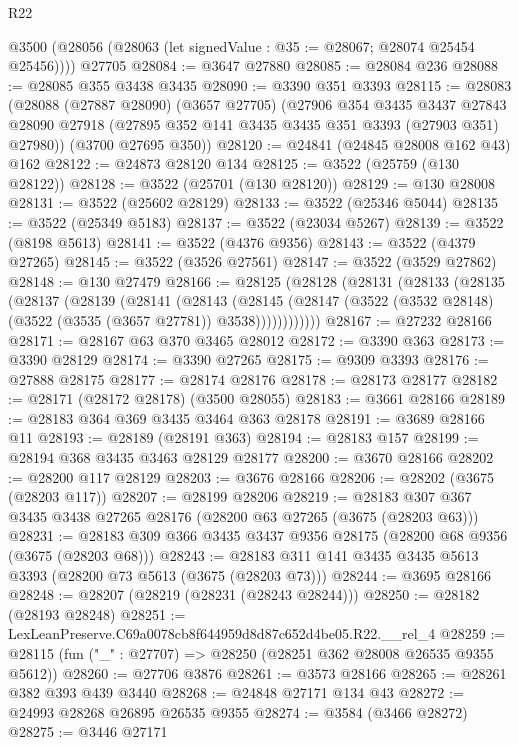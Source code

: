 \begin{lexlean}{R22}
\begin{coremodule}
    @3500 (@28056 (@28063 (let signedValue : @35 := @28067; @28074 @25454 @25456))))
    @27705
@28084 := @3647 @27880
@28085 := @28084 @236
@28088 := @28085 @355 @3438 @3435
@28090 := @3390 @351 @3393
@28115 := @28083
    (@28088
      (@27887 @28090)
      (@3657 @27705)
      (@27906
        @354
        @3435
        @3437
        @27843
        @28090
        @27918
        (@27895 @352 @141 @3435 @3435 @351 @3393 (@27903 @351) @27980))
      (@3700 @27695 @350))
@28120 := @24841 (@24845 @28008 @162 @43) @162
@28122 := @24873 @28120 @134
@28125 := @3522 (@25759 (@130 @28122))
@28128 := @3522 (@25701 (@130 @28120))
@28129 := @130 @28008
@28131 := @3522 (@25602 @28129)
@28133 := @3522 (@25346 @5044)
@28135 := @3522 (@25349 @5183)
@28137 := @3522 (@23034 @5267)
@28139 := @3522 (@8198 @5613)
@28141 := @3522 (@4376 @9356)
@28143 := @3522 (@4379 @27265)
@28145 := @3522 (@3526 @27561)
@28147 := @3522 (@3529 @27862)
@28148 := @130 @27479
@28166 := @28125
    (@28128
      (@28131
        (@28133
          (@28135
            (@28137
              (@28139
                (@28141
                  (@28143
                    (@28145
                      (@28147 (@3522 (@3532 @28148) (@3522 (@3535 (@3657 @27781)) @3538))))))))))))
@28167 := @27232 @28166
@28171 := @28167 @63 @370 @3465 @28012
@28172 := @3390 @363
@28173 := @3390 @28129
@28174 := @3390 @27265
@28175 := @9309 @3393
@28176 := @27888 @28175
@28177 := @28174 @28176
@28178 := @28173 @28177
@28182 := @28171 (@28172 @28178) (@3500 @28055)
@28183 := @3661 @28166
@28189 := @28183 @364 @369 @3435 @3464 @363 @28178
@28191 := @3689 @28166 @11
@28193 := @28189 (@28191 @363)
@28194 := @28183 @157
@28199 := @28194 @368 @3435 @3463 @28129 @28177
@28200 := @3670 @28166
@28202 := @28200 @117 @28129
@28203 := @3676 @28166
@28206 := @28202 (@3675 (@28203 @117))
@28207 := @28199 @28206
@28219 := @28183 @307 @367 @3435 @3438 @27265 @28176 (@28200 @63 @27265 (@3675 (@28203 @63)))
@28231 := @28183 @309 @366 @3435 @3437 @9356 @28175 (@28200 @68 @9356 (@3675 (@28203 @68)))
@28243 := @28183 @311 @141 @3435 @3435 @5613 @3393 (@28200 @73 @5613 (@3675 (@28203 @73)))
@28244 := @3695 @28166
@28248 := @28207 (@28219 (@28231 (@28243 @28244)))
@28250 := @28182 (@28193 @28248)
@28251 := LexLeanPreserve.C69a0078cb8f644959d8d87c652d4be05.R22.__rel_4
@28259 := @28115 (fun ("_" : @27707) => @28250 (@28251 @362 @28008 @26535 @9355 @5612))
@28260 := @27706 @3876
@28261 := @3573 @28166
@28265 := @28261 @382 @393 @439 @3440
@28268 := @24848 @27171 @134 @43
@28272 := @24993 @28268 @26895 @26535 @9355
@28274 := @3584 (@3466 @28272)
@28275 := @3446 @27171

\end{coremodule}
\end{lexlean}
